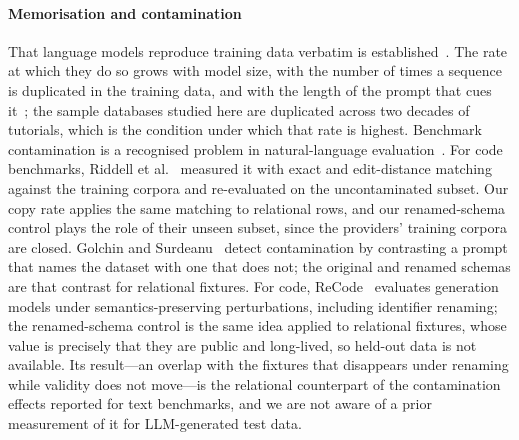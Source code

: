 \documentclass[preprint,12pt]{elsarticle}
\begin{document}
\paragraph{Memorisation and contamination} That language models reproduce training data verbatim is established~\cite{carlini2021extracting}. The rate at which they do so grows with model size, with the number of times a sequence is duplicated in the training data, and with the length of the prompt that cues it~\cite{carlini2023quantifying}; the sample databases studied here are duplicated across two decades of tutorials, which is the condition under which that rate is highest. Benchmark contamination is a recognised problem in natural-language evaluation~\cite{magar2022contamination,sainz2023contamination,golchin2024timetravel}. For code benchmarks, Riddell et al.~\cite{riddell2024contamination} measured it with exact and edit-distance matching against the training corpora and re-evaluated on the uncontaminated subset. Our copy rate applies the same matching to relational rows, and our renamed-schema control plays the role of their unseen subset, since the providers' training corpora are closed. Golchin and Surdeanu~\cite{golchin2024timetravel} detect contamination by contrasting a prompt that names the dataset with one that does not; the original and renamed schemas are that contrast for relational fixtures. For code, ReCode~\cite{wang2023recode} evaluates generation models under semantics-preserving perturbations, including identifier renaming; the renamed-schema control is the same idea applied to relational fixtures, whose value is precisely that they are public and long-lived, so held-out data is not available. Its result---an overlap with the fixtures that disappears under renaming while validity does not move---is the relational counterpart of the contamination effects reported for text benchmarks, and we are not aware of a prior measurement of it for LLM-generated test data.
\end{document}
